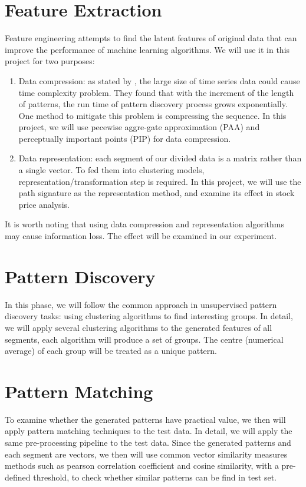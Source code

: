 \section{Feature Extraction}
\label{sec:Feature}
Feature engineering attempts to find the latent features of original data that can improve the performance of machine learning algorithms. We will use it in this project for two purposes:
\begin{enumerate}
    \item Data compression: as stated by \cite{fu2001pattern}, the large size of time series data could cause time complexity problem. They found that with the increment of the length of patterns, the run time of pattern discovery process grows exponentially. One method to mitigate this problem is compressing the sequence. In this project, we will use pecewise aggre-gate approximation (PAA) and perceptually important points (PIP) for data compression.
    \item Data representation: each segment of our divided data is a matrix rather than a single vector. To fed them into clustering models, representation/transformation step is required. In this project, we will use the path signature as the representation method, and examine its effect in stock price analysis.
\end{enumerate}
It is worth noting that using data compression and representation algorithms may cause information loss. The effect will be examined in our experiment.

\section{Pattern Discovery}
\label{sec:Discovery}
In this phase, we will follow the common approach in unsupervised pattern discovery tasks: using clustering algorithms to find interesting groups. In detail, we will apply several clustering algorithms to the generated features of all segments, each algorithm will produce a set of groups. The centre (numerical average) of each group will be treated as a unique pattern.

\section{Pattern Matching}
\label{sec:Matching}
To examine whether the generated patterns have practical value, we then will apply pattern matching techniques to the test data. In detail, we will apply the same pre-processing pipeline to the test data. Since the generated patterns and each segment are vectors, we then will use common vector similarity measures methods such as pearson correlation coefficient and cosine similarity, with a pre-defined threshold, to check whether similar patterns can be find in test set.

